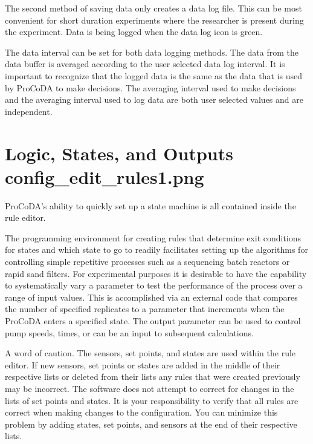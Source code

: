 \documentclass[letterpaper,10pt,english]{sphinxmanual}
\begin{document}
The second method of saving data only creates a data log file. This can be most convenient for short duration experiments where the researcher is present during the experiment. Data is being logged when the data log icon is green. 

The data interval can be set for both data logging methods. The data from the data buffer is averaged according to the user selected data log interval. It is important to recognize that the logged data is  the same as the data that is used by ProCoDA to make decisions. The averaging interval used to make decisions and the averaging interval used to log data are both user selected values and are independent.


\section[Logic, States, and Outputs]{Logic, States, and Outputs \lowercase{\sphinxincludegraphics}{{config_edit_rules1}.png}}
\label{\detokenize{ProCoDA/ProCoDA:logic-states-and-outputs-config-edit-rules}}\label{\detokenize{ProCoDA/ProCoDA:heading-procoda-logic}}
ProCoDA’s ability to quickly set up a state machine is all contained inside the rule editor.

The programming environment for creating rules that determine exit conditions for states and which state to go to readily facilitates setting up the algorithms for controlling simple repetitive processes such as a sequencing batch reactors or rapid sand filters. For experimental purposes it is desirable to have the capability to systematically vary a parameter to test the performance of the process over a range of input values. This is accomplished via an external code that compares the number of specified replicates to a parameter that increments when the ProCoDA enters a specified state. The output parameter can be used to control pump speeds, times, or can be an input to subsequent calculations.

A word of caution. The sensors, set points, and states are used within the rule editor. If new sensors, set points or states are added in the middle of their respective lists or deleted from their lists any rules that were created previously may be incorrect. The software does not attempt to correct for changes in the lists of set points and states. It is your responsibility to verify that all rules are correct when making changes to the configuration. You can minimize this problem by adding states, set points, and sensors at the end of their respective lists.
\end{document}
